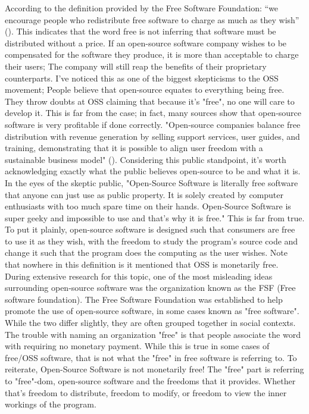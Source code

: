 \documentclass[11pt]{article}
\begin{document}
According to the definition provided by the Free Software Foundation: “we encourage people who redistribute free software to charge as much as they wish” (\cite{SellingFreeSoftware}). This indicates that the word free is not inferring that software must be distributed without a price. If an open-source software company wishes to be compensated for the software they produce, it is more than acceptable to charge their users; The company will still reap the benefits of their proprietary counterparts. I've noticed this as one of the biggest skepticisms to the OSS movement; People believe that open-source equates to everything being free. They throw doubts at OSS claiming that because it's "free", no one will care to develop it. This is far from the case; in fact, many sources show that open-source software is very profitable if done correctly. "Open-source companies balance free distribution with revenue generation by selling support services, user guides, and training, demonstrating that it is possible to align user freedom with a sustainable business model" (\cite{SacksCompetition2015}). Considering this public standpoint, it's worth acknowledging exactly what the public believes open-source to be and what it is. In the eyes of the skeptic public, "Open-Source Software is literally free software that anyone can just use as public property. It is solely created by computer enthusiasts with too much spare time on their hands. Open-Source Software is super geeky and impossible to use and that's why it is free." This is far from true. To put it plainly, open-source software is designed such that consumers are free to use it as they wish, with the freedom to study the program's source code and change it such that the program does the computing as the user wishes. Note that nowhere in this definition is it mentioned that OSS is monetarily free. During extensive research for this topic, one of the most misleading ideas surrounding open-source software was the organization known as the FSF (Free software foundation). The Free Software Foundation was established to help promote the use of open-source software, in some cases known as "free software". While the two differ slightly, they are often grouped together in social contexts. The trouble with naming an organization "free" is that people associate the word with requiring no monetary payment. While this is true in some cases of free/OSS software, that is not what the "free" in free software is referring to. To reiterate, Open-Source Software is not monetarily free! The "free" part is referring to "free"-dom, open-source software and the freedoms that it provides. Whether that's freedom to distribute, freedom to modify, or freedom to view the inner workings of the program. 
    
\end{document}
